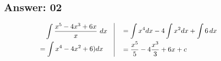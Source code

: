 \documentclass[17pt]{extarticle}
\begin{document}
\begin{fleqn}

\section{Answer: 02}

\begin{equation} \nonumber
\begin{alignedat}{4}
& \quad \int \frac{x^5 - 4x^3 + 6x}{x}\ dx\\
&= \int x^4 - 4x^2 +6)dx\\
\end{alignedat}
\quad
\vrule
\quad
\begin{alignedat}{4}
&= \int x^4dx - 4\int x^2dx +\int 6\,dx\\
&= \frac{x^5}{5}-4\frac{x^3}{3}+6x +c
\end{alignedat}
\end{equation}
\quad


\end{fleqn}
\end{document}
